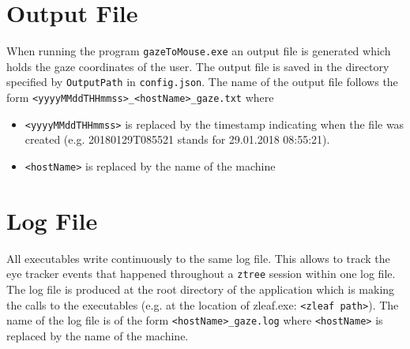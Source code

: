 \documentclass[a4paper,oneside]{book}
\begin{document}
\section{Output File}
When running the program \texttt{gazeToMouse.exe} an output file is generated which holds the gaze coordinates of the user.
The output file is saved in the directory specified by \texttt{OutputPath} in \texttt{config.json}.
The name of the output file follows the form \texttt{<yyyyMMddTHHmmss>\_<hostName>\_gaze.txt} where

\begin{itemize}
    \item \texttt{<yyyyMMddTHHmmss>} is replaced by the timestamp indicating when the file was created (e.g. 20180129T085521 stands for 29.01.2018 08:55:21).
    \item \texttt{<hostName>} is replaced by the name of the machine
\end{itemize}

\section{Log File}
All executables write continuously to the same log file.
This allows to track the eye tracker events that happened throughout a \texttt{ztree} session within one log file.
The log file is produced at the root directory of the application which is making the calls to the executables (e.g. at the location of zleaf.exe: \texttt{<zleaf path>}).
The name of the log file is of the form \texttt{<hostName>\_gaze.log} where \texttt{<hostName>} is replaced by the name of the machine.
\end{document}
